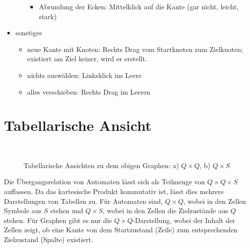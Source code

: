 \begin{itemize}
\begin{itemize}
\begin{itemize}
\item Abrundung der Ecken: Mittelklick auf die Kante (gar nicht, leicht, stark)
\end{itemize}
\end{itemize}
\item sonstiges
\begin{itemize}                
\item neue Kante mit Knoten: Rechts Drag vom Startknoten zum Zielknoten; existiert am Ziel keiner, wird er erstellt.
\item nichts auswählen: Linksklick ins Leere
\item alles verschieben: Rechts Drag im Leeren
\end{itemize}
\end{itemize}
\section{Tabellarische Ansicht}
\begin{figure}
\centering
\\%
\caption{Tabellarische Ansichten zu dem obigen Graphen: a) $Q \times Q$, b) $Q \times S$ }
\label{table}
\end{figure}
Die Übergangsrelation von Automaten lässt sich als Teilmenge von $Q \times Q \times S$ auffassen. Da das kartesische Produkt kommutativ ist, lässt dies mehrere Darstellungen von Tabellen zu. Für Automaten sind, $Q \times Q$, wobei in den Zellen Symbole aus $S$ stehen und $Q \times S$, wobei in den Zellen die Zielzustände aus $Q$ stehen. Für Graphen gibt es nur die $Q \times Q$-Darstellung, wobei der Inhalt der Zellen zeigt, ob eine Kante von dem Startzustand (Zeile) zum entsprechenden Zielzustand (Spalte) existiert.

